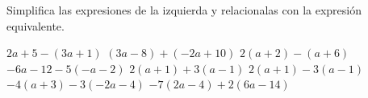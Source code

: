 Simplifica las expresiones de la izquierda y relacionalas con la expresión equivalente.

\begin{multicols}{2}
    \begin{flushright}
        \begin{choices}
            \choice $2a+5 - (3a+1)$
            \choice $(3a-8)+(-2a+10)$
            \choice $2(a+2)-(a+6)$
            \choice $-6a-12-5(-a-2)$
            \choice $2(a+1)+3(a-1)$
            \choice $2(a+1)-3(a-1)$
            \choice $-4(a+3)-3(-2a-4)$
            \choice $-7(2a-4)+2(6a-14)$
        \end{choices}
    \end{flushright}

    \columnbreak

\end{multicols}
